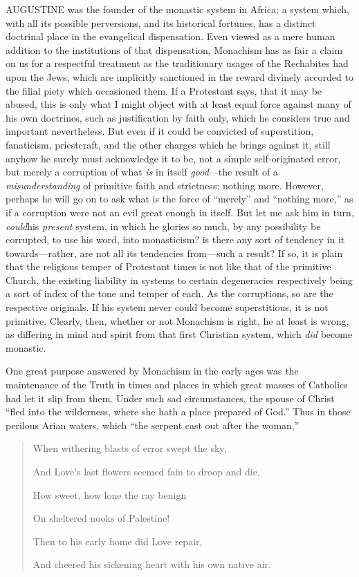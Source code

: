 AUGUSTINE was the founder of the monastic
system in Africa; a system which, with all its possible perversions,
and its historical fortunes, has a distinct doctrinal place in the
evangelical dispensation. Even viewed as a mere human addition to the
institutions of that dispensation, Monachism has as fair a claim on us
for a respectful treatment as the traditionary usages of the
Rechabites had upon the Jews, which are implicitly sanctioned in the
reward divinely accorded to the filial piety which occasioned them. If
a Protestant says, that it may be abused, this is only what I might
object with at least equal force against many of his own doctrines,
such as justification by faith only, which he considers true and
important nevertheless. But even if it could be convicted of
superstition, fanaticism, priestcraft, and the other charges which he
brings against it, still anyhow he surely must acknowledge it to be,
not a simple self-originated error, but merely a corruption of what \emph{is}
in itself \emph{good}—the result of a \emph{misunderstanding} of
primitive faith and strictness; nothing more. However, perhaps he
will go on to ask what is the force of ``merely'' and
``nothing more,'' as if a corruption were not an evil great
enough in itself. But let me ask him in turn, \emph{could}his \emph{present}
system, in which he glories so much, by any possibility be corrupted,
to use his word, into monasticism? is there any sort of tendency in it
towards—rather, are not all its tendencies from—such a result? If
so, it is plain that the religious temper of Protestant times is not
like that of the primitive Church, the existing liability in systems
to certain degeneracies respectively being a sort of index of the tone
and temper of each. As the corruptions, so are the respective
originals. If his system never could become superstitious, it is not
primitive. Clearly, then, whether or not Monachism is right, he at
least is wrong, as differing in mind and spirit from that first
Christian system, which \emph{did} become monastic.

One great purpose answered by Monachism in the early ages was the
maintenance of the Truth in times and places in which great masses of
Catholics had let it slip from them. Under such sad circumstances, the
spouse of Christ ``fled into the wilderness, where she hath a
place prepared of God.'' Thus in those perilous Arian waters,
which ``the serpent cast out after the woman,''

\begin{quote}

When withering blasts of error swept the sky,

And Love's last flowers seemed fain to droop and die,

How sweet, how lone the ray benign

On sheltered nooks of Palestine!

Then to his early home did Love repair,

And cheered his sickening heart with his own native air.

\end{quote}

